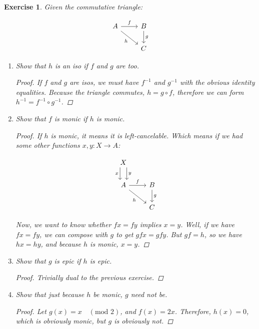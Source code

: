 \documentclass[]{article}
\newtheorem{exercise}{Exercise}
\newcommand{\tfarr}[4][\to]{\ensuremath{#2 : #3 #1 #4}}
\begin{document}
\begin{exercise}
  Given the commutative triangle:

$$\begin{tikzcd}
  A \arrow{r}{f} \arrow[swap]{dr}{h} & B \arrow{d}{g} \\
  & C
\end{tikzcd}$$

\begin{enumerate}
\item{
    Show that $h$ is an iso if $f$ and $g$ are too.

    \begin{proof}
      If $f$ and $g$ are isos, we must have $f^{-1}$ and $g^{-1}$ with the
      obvious identity equalities. Because the triangle commutes, $h = g\circ
      f$, therefore we can form $h^{-1} = f^{-1}\circ g^{-1}$.
    \end{proof}}

\item{
    Show that $f$ is monic if $h$ is monic.

    \begin{proof}
      If $h$ is monic, it means it is left-cancelable. Which means if we had
      some other functions \tfarr{x, y}{X}{A}:

$$\begin{tikzcd}
  X \arrow[shift left=2]{d}{y} \arrow[swap, shift right=2]{d}{x} & \\
  A \arrow{r}{f} \arrow[swap]{dr}{h} & B \arrow{d}{g} \\
  & C
\end{tikzcd}$$

      Now, we want to know whether $fx = fy$ implies $x = y$. Well, if we have
      $fx = fy$, we can compose with $g$ to get $gfx = gfy$. But $gf = h$, so we
      have $hx = hy$, and because $h$ is monic, $x = y$.
    \end{proof}}

\item{
    Show that $g$ is epic if $h$ is epic.
    \begin{proof}
      Trivially dual to the previous exercise.
    \end{proof}}

\item{
    Show that just because $h$ be monic, $g$ need not be.
    \begin{proof}
      Let $g(x) = x\quad(\text{mod } 2)$, and $f(x) = 2x$. Therefore, $h(x) =
      0$, which is obviously monic, but $g$ is obviously not.
    \end{proof}}
\end{enumerate}
\end{exercise}
\end{document}
